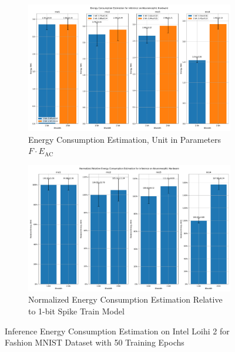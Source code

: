         \begin{figure}[!htpb]
            \centering
            \begin{subfigure}[H]{0.48\textwidth}
                \includegraphics[width=\textwidth]{../firerate/FashionMNIST/plots/fashionmnist_test_energy_nh.pdf}
                \caption{Energy Consumption Estimation, Unit in Parameters $F\cdot E_{\text{AC}}$}
            \end{subfigure}
            \hfill
            \begin{subfigure}[H]{0.48\textwidth}
                \includegraphics[width=\textwidth]{../firerate/FashionMNIST/plots/fashionmnist_test_relative_energy_nh.pdf}
                \caption{Normalized Energy Consumption Estimation Relative to 1-bit Spike Train Model}
            \end{subfigure}
            \caption{Inference Energy Consumption Estimation on Intel Loihi 2 for Fashion MNIST Dataset with 50 Training Epochs}
            \label{fig:inference_energy_nh_firerate}
        \end{figure}

